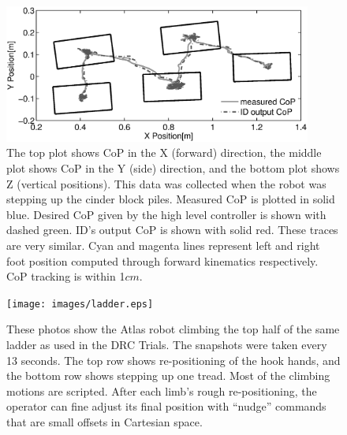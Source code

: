 \documentclass{ws-ijhr}
\begin{document}
\begin{figure}
  \begin{center}
    \includegraphics[width=0.9\textwidth]{images/cop_gray.eps} 
    \caption{The top plot shows CoP in the X (forward) direction, the middle plot 
      shows CoP in the Y (side) direction, and the bottom plot shows
      Z (vertical positions). This data was collected when the robot was 
      stepping up the cinder block piles. Measured CoP is plotted in solid blue.
      Desired CoP given by the high level controller is shown with dashed green. ID's 
      output CoP is shown with solid red. These traces are very similar.
      Cyan and magenta lines represent 
      left and right foot position computed through forward kinematics 
      respectively. CoP tracking is within 1$cm$. }

    \label{fig:walk_cop} 
  \end{center}
\end{figure}    

\begin{figure}
  \begin{center}
    {\texttt{[image: images/ladder.eps]}}
    \caption{
      These photos show the Atlas robot climbing the top half of the same 
      ladder as used in the DRC Trials. The snapshots were taken every 13 seconds. The
      top row shows re-positioning of the hook hands, and the bottom row shows
      stepping up one tread. Most of the climbing motions are scripted. After
      each limb's rough re-positioning, the operator can fine adjust its final 
      position with ``nudge'' commands that are small offsets in Cartesian 
      space. 
      }\label{fig:ladder_pic} 
  \end{center}
\end{figure}    
\end{document}
